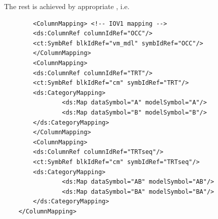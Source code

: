 The rest is achieved by appropriate , i.e.
\lstset{language=XML}
\begin{lstlisting}
        <ColumnMapping>	<!-- IOV1 mapping -->
	    <ds:ColumnRef columnIdRef="OCC"/>
	    <ct:SymbRef blkIdRef="vm_mdl" symbIdRef="OCC"/>
        </ColumnMapping>
        <ColumnMapping>
	    <ds:ColumnRef columnIdRef="TRT"/>
	    <ct:SymbRef blkIdRef="cm" symbIdRef="TRT"/>
	    <ds:CategoryMapping>
                <ds:Map dataSymbol="A" modelSymbol="A"/>
                <ds:Map dataSymbol="B" modelSymbol="B"/>
	    </ds:CategoryMapping>
        </ColumnMapping>
        <ColumnMapping>
	    <ds:ColumnRef columnIdRef="TRTseq"/>
	    <ct:SymbRef blkIdRef="cm" symbIdRef="TRTseq"/>
	    <ds:CategoryMapping>
                <ds:Map dataSymbol="AB" modelSymbol="AB"/>
                <ds:Map dataSymbol="BA" modelSymbol="BA"/>
	    </ds:CategoryMapping>
	</ColumnMapping>
\end{lstlisting}


%
%
%
%
%
%


%


